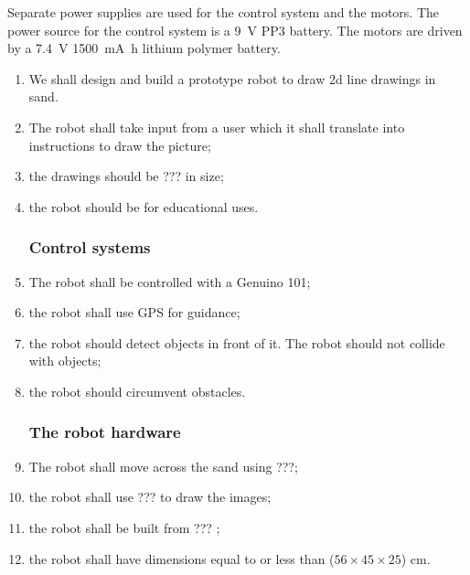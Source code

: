     Separate power supplies are used for the control system and the motors. The power source for the control system is a \SI{9}{\volt} PP3 battery. The motors are driven by a \SI{7.4}{\volt} \SI{1500}{\milli\ampere\hour} lithium polymer battery.


    \label{outline specification}
        \begin{enumerate} %
            \subsubsection{The project}
            \item We shall design and build a prototype robot to draw 2d line drawings in sand.\label{spec: draw}
            \item The robot shall take input from a user which it shall translate into instructions to draw the picture;\label{spec: take input}
            \item the drawings should be ???  in size; \label{spec: drawing size}
            \item the robot should be for educational uses. \label{spec: education}

            \subsubsection{Control systems}
            \item The robot shall be controlled with a \gls{Genuino} 101; \label{spec: arduino}
            \item the robot shall use \gls{GPS} for guidance; \label{spec: gps}
            \item the robot should detect objects in front of it. The robot should not collide with objects; \label{spec: detect objects}
            \item the robot should circumvent obstacles.\label{spec: circumvent}

            \subsubsection{The robot hardware}
            \item The robot shall move across the sand using ???; \label{spec: movement}
            \item the robot shall use ???  to draw the images; \label{spec: tool}
            \item the robot shall be built from ??? ; \label{spec: material}
            \item the robot shall have dimensions equal to or less than ($56 \times 45 \times 25$) cm. \label{spec: robot size}


\end{enumerate}
